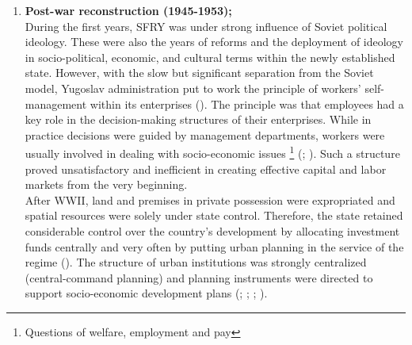 \documentclass[11pt]{report}
\begin{document}
\begin{enumerate}

\item  \textbf{Post-war reconstruction (1945-1953);}
\\
During the first years, SFRY was under strong influence of Soviet political ideology. These were also the years of reforms and the deployment of ideology in socio-political, economic, and cultural terms within the newly established state. However, with the slow but significant separation from the Soviet model, Yugoslav administration put to work the principle of workers’ self-management within its enterprises (\href{Zec}{\citealt{zec_economic_2012}}). The principle was that employees had a key role in the decision-making structures of their enterprises. While in practice decisions were guided by management departments, workers were usually involved in dealing with socio-economic issues
\footnote{Questions of welfare, employment and pay}
(\href{Lydall}{\citealt{lydall_yugoslav_1986}}; \href{Estrin}{\citealt{estrin_yugoslavia:_1991}}).
Such a structure proved unsatisfactory and inefficient in creating effective capital and labor markets from the very beginning.
\\

After WWII, land and premises in private possession were expropriated and spatial resources were solely under state control. Therefore, the state retained considerable control over the country’s development by allocating investment funds centrally and very often by putting urban planning in the service of the regime  (\href{Estrin}{\citealt{estrin_yugoslavia:_1991}}). The structure of urban institutions was strongly centralized (central-command planning) and planning instruments were directed to support socio-economic development plans (\href{Borovnica}{\citealt{borovnica_osvrt_1980}}; \href{Pajovic}{\citealt{pajovic_pregled_2005}}; \href{Nedovic}{\citealt{nedovic-budic_mornings_2011}}; \href{Peric}{\citealt{peric_evolution_2016}}). 


\end{enumerate}
\end{document}
